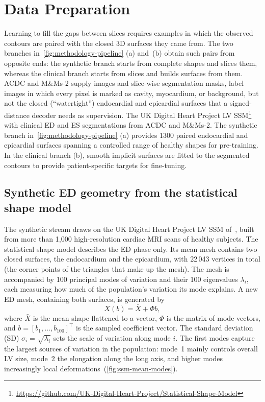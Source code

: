 \section{Data Preparation}
\label{sec:data-preparation}
\noindent
Learning to fill the gaps between slices requires examples in which the
observed contours are paired with the closed 3D surfaces they came from. The
two branches in~\cref{fig:methodology-pipeline} (a) and~(b) obtain such pairs
from opposite ends: the synthetic branch starts from complete shapes and
slices them, whereas the clinical branch starts from slices and builds
surfaces from them. ACDC and M\&Ms-2 supply images and slice-wise segmentation
masks, label images in which every pixel is marked as cavity, myocardium, or
background, but not the closed (``watertight'') endocardial and epicardial
surfaces that a signed-distance decoder needs as supervision. The UK Digital
Heart Project LV
SSM\footnote{\url{https://github.com/UK-Digital-Heart-Project/Statistical-Shape-Model}}
with clinical ED and ES segmentations from ACDC and M\&Ms-2. The synthetic
branch in~\cref{fig:methodology-pipeline} (a) provides 1300 paired endocardial
and epicardial surfaces spanning a controlled range of healthy shapes for
pre-training. In the clinical branch (b), smooth implicit surfaces are fitted
to the segmented contours to provide patient-specific targets for fine-tuning.

\subsection{Synthetic ED geometry from the statistical shape model}
\label{subsec:missing-ground-truth}
\noindent
The synthetic stream draws on the UK Digital Heart Project LV SSM of~\textcite{bai2015biventricularatlas}, built from more than 1,000
high-resolution cardiac MRI scans of healthy subjects. The statistical shape model describes the
ED phase only. Its mean mesh contains two closed surfaces, the endocardium and
the epicardium, with 22\,043 vertices in total (the corner points of the
triangles that make up the mesh). The mesh is accompanied by 100 principal
modes of variation and their
100 eigenvalues $\lambda_i$, each measuring how much of the population's
variation its mode explains. A new ED mesh, containing both surfaces, is
generated by
\begin{equation}
	X(b) = \bar{X} + \Phi b,
	\label{eq:ssm-generation}
\end{equation}
where $\bar{X}$ is the mean shape flattened to a vector, $\Phi$ is the matrix of
mode vectors, and $b = [b_1, \ldots, b_{100}]^\top$ is the sampled coefficient
vector. The standard deviation (SD) $\sigma_i = \sqrt{\lambda_i}$ sets the scale of
variation along mode $i$. The first modes capture the largest sources of
variation in the population: mode~1 mainly controls overall LV size, mode~2 the
elongation along the long axis, and higher modes increasingly local
deformations~(\cref{fig:ssm-mean-modes}).

